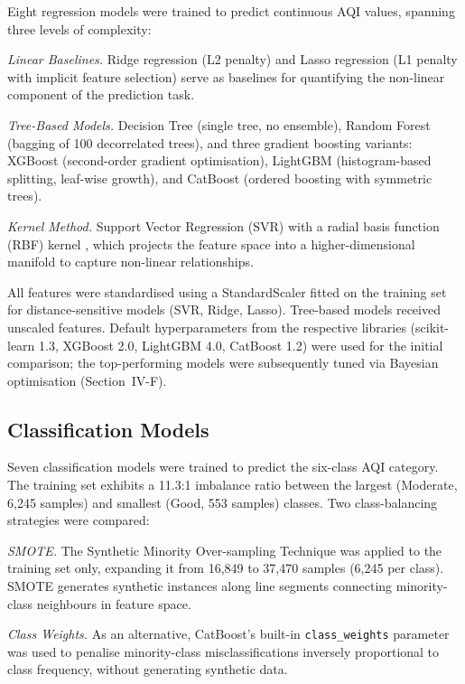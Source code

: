\documentclass[conference]{IEEEtran}
\begin{document}
Eight regression models were trained to predict continuous AQI values, spanning three levels of complexity:

\textit{Linear Baselines.} Ridge regression (L2 penalty) and Lasso regression (L1 penalty with implicit feature selection) serve as baselines for quantifying the non-linear component of the prediction task.

\textit{Tree-Based Models.} Decision Tree (single tree, no ensemble), Random Forest \cite{breiman2001} (bagging of 100 decorrelated trees), and three gradient boosting variants: XGBoost \cite{chen2016} (second-order gradient optimisation), LightGBM \cite{ke2017} (histogram-based splitting, leaf-wise growth), and CatBoost \cite{prokhorenkova2018} (ordered boosting with symmetric trees).

\textit{Kernel Method.} Support Vector Regression (SVR) with a radial basis function (RBF) kernel \cite{cortes1995}, which projects the feature space into a higher-dimensional manifold to capture non-linear relationships.

All features were standardised using a StandardScaler fitted on the training set for distance-sensitive models (SVR, Ridge, Lasso). Tree-based models received unscaled features. Default hyperparameters from the respective libraries (scikit-learn 1.3, XGBoost 2.0, LightGBM 4.0, CatBoost 1.2) were used for the initial comparison; the top-performing models were subsequently tuned via Bayesian optimisation (Section~IV-F).

\subsection{Classification Models}

Seven classification models were trained to predict the six-class AQI category. The training set exhibits a 11.3:1 imbalance ratio between the largest (Moderate, 6{,}245 samples) and smallest (Good, 553 samples) classes. Two class-balancing strategies were compared:

\textit{SMOTE.} The Synthetic Minority Over-sampling Technique \cite{chawla2002} was applied to the training set only, expanding it from 16{,}849 to 37{,}470 samples (6{,}245 per class). SMOTE generates synthetic instances along line segments connecting minority-class neighbours in feature space.

\textit{Class Weights.} As an alternative, CatBoost's built-in \texttt{class\_weights} parameter was used to penalise minority-class misclassifications inversely proportional to class frequency, without generating synthetic data.
\end{document}
